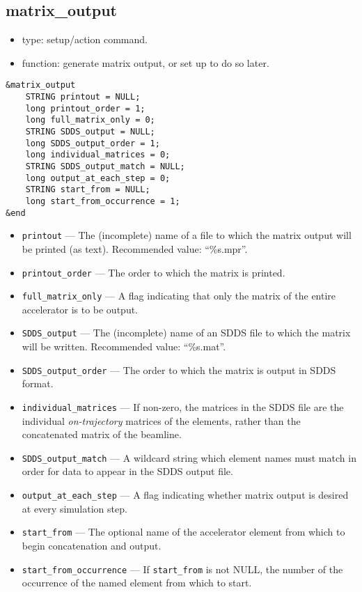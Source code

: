 \documentclass[11pt]{article}
\begin{document}
\subsection{matrix\_output \label{subsec:matrixoutput}}

\begin{itemize}
\item type: setup/action command.
\item function: generate matrix output, or set up to do so later.
\end{itemize}

\begin{verbatim}
&matrix_output
    STRING printout = NULL;
    long printout_order = 1;
    long full_matrix_only = 0;
    STRING SDDS_output = NULL;
    long SDDS_output_order = 1;
    long individual_matrices = 0;
    STRING SDDS_output_match = NULL;
    long output_at_each_step = 0;
    STRING start_from = NULL;
    long start_from_occurrence = 1;
&end
\end{verbatim}

\begin{itemize}
\item \verb|printout| --- The (incomplete) name of a file to which the 
matrix output will be printed (as text).  Recommended value: ``\%s.mpr''.
\item \verb|printout_order| --- The order to which the matrix is printed.
\item \verb|full_matrix_only| --- A flag indicating that only the matrix of
the entire accelerator is to be output.
\item \verb|SDDS_output| --- The (incomplete) name of an SDDS 
file to which the matrix will be written.  Recommended value: ``\%s.mat''.
\item \verb|SDDS_output_order| --- The order to which the matrix is output in SDDS format.
\item \verb|individual_matrices| --- If non-zero, the matrices in the SDDS file are the individual
{\em on-trajectory} matrices of the elements, rather than the concatenated matrix of the beamline.
\item \verb|SDDS_output_match| --- A wildcard string which element names must match in
order for data to appear in the SDDS output file.
\item \verb|output_at_each_step| --- A flag indicating whether matrix output
is desired at every simulation step.
\item \verb|start_from| --- The optional name of the accelerator element
from which to begin concatenation and output.
\item \verb|start_from_occurrence| --- If \verb|start_from| is not NULL, the
number of the occurrence of the named element from which to start.
\end{itemize}
\end{document}
